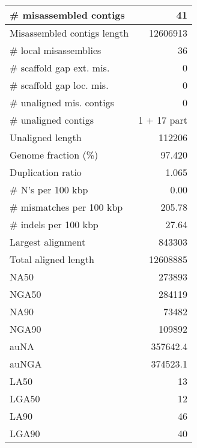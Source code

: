 \documentclass[12pt,a4paper]{article}
\begin{document}
\begin{table}[ht]
\begin{center}
\begin{tabular}{|l*{1}{|r}|}
\# misassembled contigs & 41 \\ \hline
Misassembled contigs length & 12606913 \\ \hline
\# local misassemblies & 36 \\ \hline
\# scaffold gap ext. mis. & 0 \\ \hline
\# scaffold gap loc. mis. & 0 \\ \hline
\# unaligned mis. contigs & 0 \\ \hline
\# unaligned contigs & 1 + 17 part \\ \hline
Unaligned length & 112206 \\ \hline
Genome fraction (\%) & 97.420 \\ \hline
Duplication ratio & 1.065 \\ \hline
\# N's per 100 kbp & 0.00 \\ \hline
\# mismatches per 100 kbp & 205.78 \\ \hline
\# indels per 100 kbp & 27.64 \\ \hline
Largest alignment & 843303 \\ \hline
Total aligned length & 12608885 \\ \hline
NA50 & 273893 \\ \hline
NGA50 & 284119 \\ \hline
NA90 & 73482 \\ \hline
NGA90 & 109892 \\ \hline
auNA & 357642.4 \\ \hline
auNGA & 374523.1 \\ \hline
LA50 & 13 \\ \hline
LGA50 & 12 \\ \hline
LA90 & 46 \\ \hline
LGA90 & 40 \\ \hline
\end{tabular}
\end{center}
\end{table}
\end{document}
